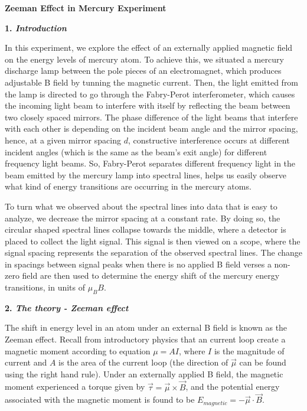 \documentclass[11pt]{article}
\begin{document}
\textbf{Zeeman Effect in Mercury Experiment}
\bigskip

\textbf{1. \textit{Introduction}}
\smallskip

In this experiment, we explore the effect of an externally applied magnetic field on the energy levels of mercury atom. To achieve this, we situated a mercury discharge lamp between the pole pieces of an electromagnet, which produces adjustable B field by tunning the magnetic current. Then, the light emitted from the lamp is directed to go through the Fabry-Perot interferometer, which causes the incoming light beam to interfere with itself by reflecting the beam between two closely spaced mirrors. The phase difference of the light beams that interfere with each other is depending on the incident beam angle and the mirror spacing, hence, at a given mirror spacing $d$, constructive interference occurs at different incident angles (which is the same as the beam's exit angle) for different frequency light beams. So, Fabry-Perot separates different frequency light in the beam emitted by the mercury lamp into spectral lines, helps us easily observe what kind of energy transitions are occurring in the mercury atoms. 

To turn what we observed about the spectral lines into data that is easy to analyze, we decrease the mirror spacing at a constant rate. By doing so, the circular shaped spectral lines collapse towards the middle, where a detector is placed to collect the light signal. This signal is then viewed on a scope, where the signal spacing represents the separation of the observed spectral lines. The change in spacings between signal peaks when there is no applied B field verses a non-zero field are then used to determine the energy shift of the mercury energy transitions, in units of $\mu_{B} B$.
\bigskip

\textbf{2. \textit{The theory - Zeeman effect}}
\smallskip

The shift in energy level in an atom under an external B field is known as the Zeeman effect. Recall from introductory physics that an current loop create a magnetic moment according to equation $\mu = AI$, where $I$ is the magnitude of current and $A$ is the area of the current loop (the direction of $\vec{\mu}$ can be found using the right hand rule). Under an externally applied B field, the magnetic moment experienced a torque given by $\vec{\tau} = \vec{\mu} \times \vec{B}$, and the potential energy associated with the magnetic moment is found to be $E_{magnetic} = - \vec{\mu} \cdot \vec{B}$.
\end{document}
